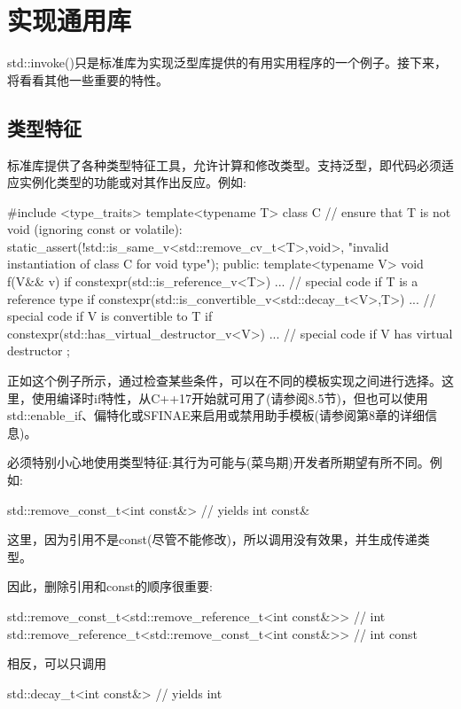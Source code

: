 \section{实现通用库}

std::invoke()只是标准库为实现泛型库提供的有用实用程序的一个例子。接下来，将看看其他一些重要的特性。

\subsection{类型特征}

标准库提供了各种类型特征工具，允许计算和修改类型。支持泛型，即代码必须适应实例化类型的功能或对其作出反应。例如:

\begin{cpp}
#include <type_traits>
template<typename T>
class C
{
	// ensure that T is not void (ignoring const or volatile):
	static_assert(!std::is_same_v<std::remove_cv_t<T>,void>,
					"invalid instantiation of class C for void type");
public:
	template<typename V>
	void f(V&& v) {
		if constexpr(std::is_reference_v<T>) {
			... // special code if T is a reference type
		}
		if constexpr(std::is_convertible_v<std::decay_t<V>,T>) {
			... // special code if V is convertible to T
		}
		if constexpr(std::has_virtual_destructor_v<V>) {
			... // special code if V has virtual destructor
		}
	}
};
\end{cpp}

正如这个例子所示，通过检查某些条件，可以在不同的模板实现之间进行选择。这里，使用编译时if特性，从C++17开始就可用了(请参阅8.5节)，但也可以使用std::enable\_if、偏特化或SFINAE来启用或禁用助手模板(请参阅第8章的详细信息)。

必须特别小心地使用类型特征:其行为可能与(菜鸟期)开发者所期望有所不同。例如:

\begin{cpp}
std::remove_const_t<int const&> // yields int const&
\end{cpp}

这里，因为引用不是const(尽管不能修改)，所以调用没有效果，并生成传递类型。

因此，删除引用和const的顺序很重要:

\begin{cpp}
std::remove_const_t<std::remove_reference_t<int const&>> // int
std::remove_reference_t<std::remove_const_t<int const&>> // int const
\end{cpp}

相反，可以只调用

\begin{cpp}
std::decay_t<int const&> // yields int
\end{cpp}

